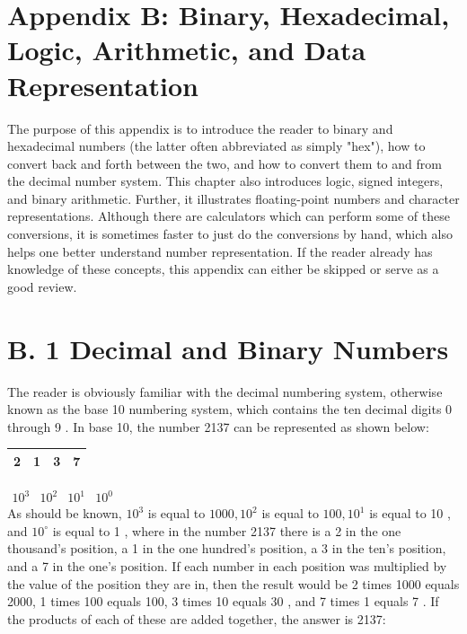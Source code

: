 \documentclass[10pt]{book}
\begin{document}
\begin{center}
\begin{center}
\begin{center}
\begin{center}
\begin{center}
\section*{Appendix B: Binary, Hexadecimal, Logic, Arithmetic, and Data Representation}
The purpose of this appendix is to introduce the reader to binary and hexadecimal numbers (the latter often abbreviated as simply "hex"), how to convert back and forth between the two, and how to convert them to and from the decimal number system. This chapter also introduces logic, signed integers, and binary arithmetic. Further, it illustrates floating-point numbers and character representations. Although there are calculators which can perform some of these conversions, it is sometimes faster to just do the conversions by hand, which also helps one better understand number representation. If the reader already has knowledge of these concepts, this appendix can either be skipped or serve as a good review.

\section*{B. 1 Decimal and Binary Numbers}
The reader is obviously familiar with the decimal numbering system, otherwise known as the base 10 numbering system, which contains the ten decimal digits 0 through 9 . In base 10, the number 2137 can be represented as shown below:

\begin{center}
\begin{tabular}{|l|l|l|l|}
\hline
2 & 1 & 3 & 7 \\
\hline
\end{tabular}
\end{center}

$\begin{array}{llll}10^{3} & 10^{2} & 10^{1} & 10^{0}\end{array}$\\
As should be known, $10^{3}$ is equal to $1000,10^{2}$ is equal to $100,10^{1}$ is equal to 10 , and $10^{\circ}$ is equal to 1 , where in the number 2137 there is a 2 in the one thousand's position, a 1 in the one hundred's position, a 3 in the ten's position, and a 7 in the one's position. If each number in each position was multiplied by the value of the position they are in, then the result would be 2 times 1000 equals 2000, 1 times 100 equals 100, 3 times 10 equals 30 , and 7 times 1 equals 7 . If the products of each of these are added together, the answer is 2137:


\end{center}
\end{center}
\end{center}
\end{center}
\end{center}
\end{document}
